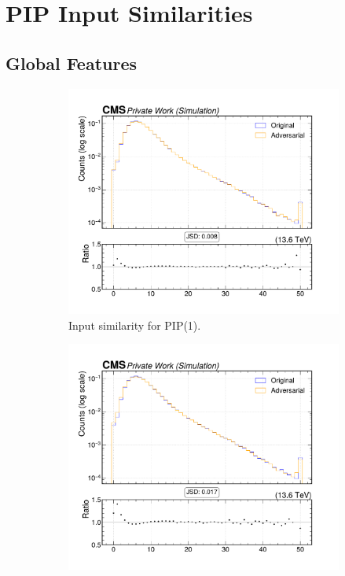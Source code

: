 \section{PIP Input Similarities}
\label{appendix:intprob}

\subsection*{Global Features}

\begin{figure}[htbp]
  \centering
  \begin{subfigure}[t]{0.32\textwidth}
    \includegraphics[width=\linewidth]{media/output/features/compare/intprob_1/cmp_global_features_n_Cpfcand.pdf}
    \caption{Input similarity for PIP(1).}
  \end{subfigure}\hfill
  \begin{subfigure}[t]{0.32\textwidth}
    \includegraphics[width=\linewidth]{media/output/features/compare/intprob_2/cmp_global_features_n_Cpfcand.pdf}

\end{subfigure}
\end{figure}
